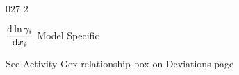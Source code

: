 \begin{mitframe}{027-2}
\begin{listone}
\begin{listtwo}
\begin{listthree}
           		\item $\dfrac{\mathrm{d}\ln\actcoeff}{\mathrm{d}\conjcoor}$ Model Specific
            
            	\begin{listfour}

					\item See Activity-Gex relationship box on Deviations page

				\end{listfour}

			\end{listthree}

		\end{listtwo}
    
    \end{listone}    


\end{mitframe}